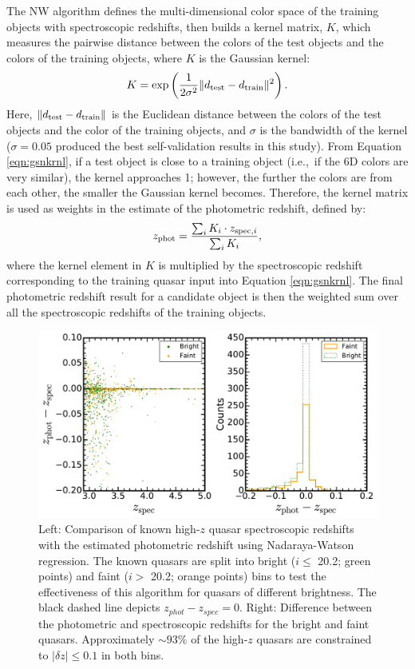 \documentclass[apj, numberedappendix]{emulateapj}
\begin{document}
The NW algorithm defines the multi-dimensional color space of the training objects with spectroscopic redshifts, then builds a kernel matrix, $K$, which measures the pairwise distance between the colors of the test objects and the colors of the training objects, where $K$ is the Gaussian kernel:
\begin{equation}
K = \exp \left( \frac{1}{2\sigma^2} \Vert d_{\rm test}-d_{\rm train}\Vert ^2\right). 
\label{eqn:gsnkrnl}
\end{equation}
Here, $\Vert d_{\rm test}-d_{\rm train}\Vert$ is the Euclidean distance between the colors of the test objects and the color of the training objects, and $\sigma$ is the bandwidth of the kernel ($\sigma= 0.05$ produced the best self-validation results in this study). From Equation \ref{eqn:gsnkrnl}, if a test object is close to a training object (i.e.,\ if the 6D colors are very similar), the kernel approaches 1; however, the further the colors are from each other, the smaller the Gaussian kernel becomes. Therefore, the kernel matrix is used as weights in the estimate of the photometric redshift, defined by:
\begin{equation}
z_{\rm phot} = \frac{\sum_i K_i \cdot z_{{\rm spec}, i}}{\sum_i K_i},
\end{equation}
where the kernel element in $K$ is multiplied by the spectroscopic redshift corresponding to the training quasar input into Equation \ref{eqn:gsnkrnl}. The final photometric redshift result for a candidate object is then the weighted sum over all the spectroscopic redshifts of the training objects. 


\begin{figure}[h!]
 \centering
 \includegraphics[scale=0.28]{./New_Plots/specz_vs_photz_S82.pdf}
 \caption{\footnotesize{Left: Comparison of known high-$z$ quasar spectroscopic redshifts with the estimated photometric redshift using Nadaraya-Watson regression. The known quasars are split into bright ($i\leq$ 20.2; green points) and faint ($i>$ 20.2; orange points) bins to test the effectiveness of this algorithm for quasars of different brightness. The black dashed line depicts $z_{phot} - z_{spec} = 0$. Right: Difference between the photometric and spectroscopic redshifts for the bright and faint quasars. Approximately $\sim93\%$ of the high-$z$ quasars are constrained to $\vert \delta z \vert \leq 0.1$ in both bins.}}
 \label{fig:photvspec}
 \end{figure}
 
\end{document}
